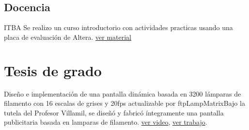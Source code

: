 \documentclass[11pt,a4paper,sans]{moderncv} 	%
\begin{document}
	\subsection{Docencia}
	 	{ITBA} 		{}{}{Se realizo un curso introductorio con actividades practicas usando una placa de evaluación de Altera. \href{http://disenioconingenio.com.ar/shop/docs/fpga.pdf} {ver material}}


\section{Tesis de grado}
 		{Diseño e implementación de una pantalla dinámica basada en 3200 lámparas de filamento con 16 escalas de grises y 20fps actualizable por ftp}{LampMatrix}{}{}{Bajo la tutela del Profesor Villamil, se diseñó y fabricó íntegramente una pantalla publicitaria basada en lamparas de filamento. \href{http://www.youtube.com/watch?v=Usx4YUNpknc}{ver video}, \href{http://disenioconingenio.com.ar/shop/docs/lampmatrix.pdf}{ver trabajo}.}
\end{document}
